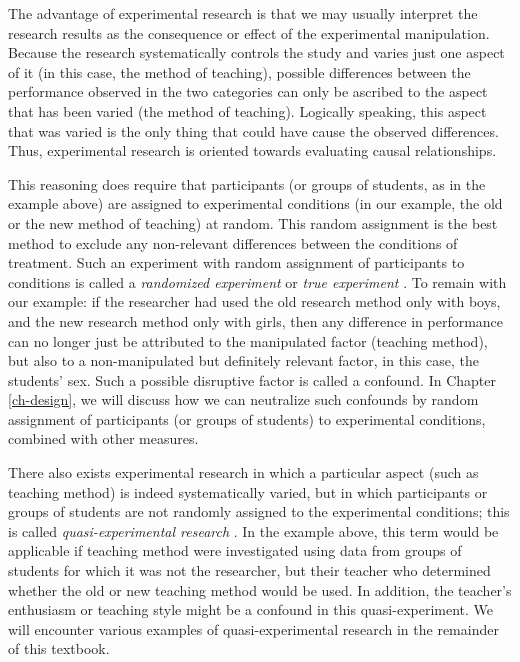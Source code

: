 \documentclass[
]{book}
\begin{document}
The advantage of experimental research is that we may usually interpret the research results as the consequence or effect of the experimental manipulation. Because the research systematically controls the study and varies just one aspect of it (in this case, the method of teaching), possible differences between the performance observed in the two categories can only be ascribed to the aspect that has been varied (the method of teaching). Logically speaking, this aspect that was varied is the only thing that could have cause the observed differences. Thus, experimental research is oriented towards evaluating causal relationships.

This reasoning does require that participants (or groups of students, as in the example above) are assigned to experimental conditions (in our example, the old or the new method of teaching) at random. This random assignment is the best method to exclude any non-relevant differences between the conditions of treatment. Such an experiment with random assignment of participants to conditions is called a \emph{randomized experiment} or \emph{true experiment} \citep{SCC02}. To remain with our example: if the researcher had used the old research method only with boys, and the new research method only with girls, then any difference in performance can no longer just be attributed to the manipulated factor (teaching method), but also to a non-manipulated but definitely relevant factor, in this case, the students' sex. Such a possible disruptive factor is called a confound. In Chapter \ref{ch-design}, we will discuss how we can neutralize such confounds by random assignment of participants (or groups of students) to experimental conditions, combined with other measures.

There also exists experimental research in which a particular aspect (such as teaching method) is indeed systematically varied, but in which participants or groups of students are not randomly assigned to the experimental conditions; this is called \emph{quasi-experimental research} \citep{SCC02}. In the example above, this term would be applicable if teaching method were investigated using data from groups of students for which it was not the researcher, but their teacher who determined whether the old or new teaching method would be used. In addition, the teacher's enthusiasm or teaching style might be a confound in this quasi-experiment. We will encounter various examples of quasi-experimental research in the remainder of this textbook.
\end{document}

